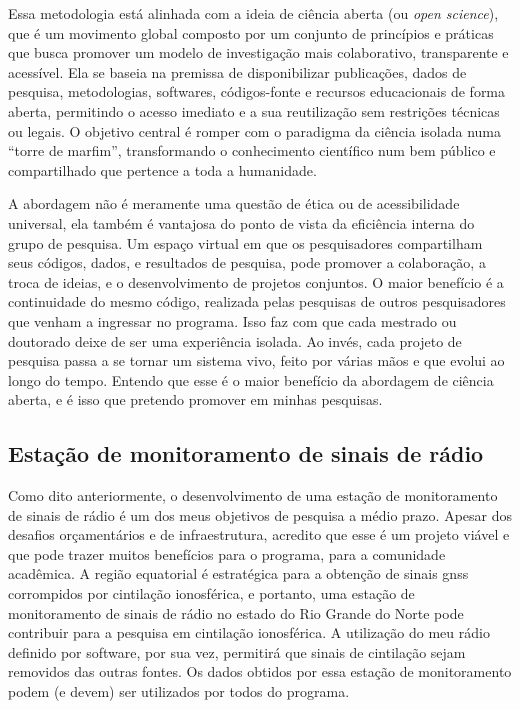 \documentclass{article}
\begin{document}
Essa metodologia está alinhada com a ideia de ciência aberta (ou \textit{open science}), que é um movimento global composto por um conjunto de princípios e práticas que busca promover um modelo de investigação mais colaborativo, transparente e acessível. Ela se baseia na premissa de disponibilizar publicações, dados de pesquisa, metodologias, softwares, códigos-fonte e recursos educacionais de forma aberta, permitindo o acesso imediato e a sua reutilização sem restrições técnicas ou legais. O objetivo central é romper com o paradigma da ciência isolada numa ``torre de marfim'', transformando o conhecimento científico num bem público e compartilhado que pertence a toda a humanidade.

A abordagem não é meramente uma questão de ética ou de acessibilidade universal, ela também é vantajosa do ponto de vista da eficiência interna do grupo de pesquisa. Um espaço virtual em que os pesquisadores compartilham seus códigos, dados, e resultados de pesquisa, pode promover a colaboração, a troca de ideias, e o desenvolvimento de projetos conjuntos. O maior benefício é a continuidade do mesmo código, realizada pelas pesquisas de outros pesquisadores que venham a ingressar no programa. Isso faz com que cada mestrado ou doutorado deixe de ser uma experiência isolada. Ao invés, cada projeto de pesquisa passa a se tornar um sistema vivo, feito por várias mãos e que evolui ao longo do tempo. Entendo que esse é o maior benefício da abordagem de ciência aberta, e é isso que pretendo promover em minhas pesquisas.

\subsection{Estação de monitoramento de sinais de rádio}

Como dito anteriormente, o desenvolvimento de uma estação de monitoramento de sinais de rádio é um dos meus objetivos de pesquisa a médio prazo. Apesar dos desafios orçamentários e de infraestrutura, acredito que esse é um projeto viável e que pode trazer muitos benefícios para o programa, para a comunidade acadêmica. A região equatorial é estratégica para a obtenção de sinais \gls{gnss} corrompidos por cintilação ionosférica, e portanto, uma estação de monitoramento de sinais de rádio no estado do Rio Grande do Norte pode contribuir para a pesquisa em cintilação ionosférica. A utilização do meu rádio definido por software, por sua vez, permitirá que sinais de cintilação sejam removidos das outras fontes. Os dados obtidos por essa estação de monitoramento podem (e devem) ser utilizados por todos do programa.
\end{document}
